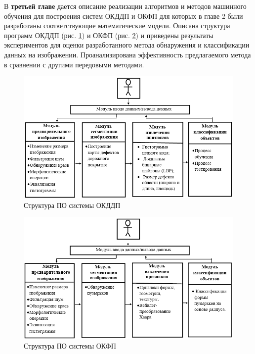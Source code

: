 В \textbf {третьей главе} дается описание реализации алгоритмов и методов машинного обучения для построения систем ОКДДП и ОКФП для которых в главе 2 были разработаны соответствующие математические модели. Описана структура программ ОКДДП (рис. \ref{pic47}) и ОКФП (рис. \ref{pic59}) и приведены результаты экспериментов для оценки разработанного метода обнаружения и классификации данных на изображении. Проанализирована эффективность предлагаемого метода в сравнении с другими передовыми методами.
\begin{figure}[ht!]
\centering
\vspace{-0.8em}
\includegraphics [width=1\linewidth]{images/pic47.png}
\caption{Структура ПО системы ОКДДП} \label{pic47}
\end{figure}

\begin{figure}[ht!]
\centering
\vspace{-0.8em}
\includegraphics [width=1\linewidth]{images/pic59.png}
\caption{Структура ПО системы ОКФП} \label{pic59}
\end{figure}


